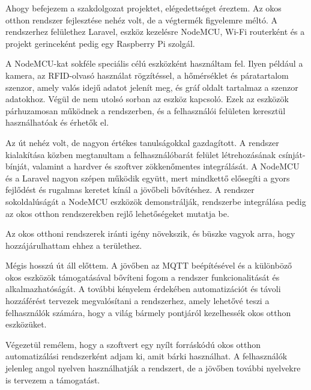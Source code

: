 \documentclass[
]{thesis-ekf}
\theoremstyle{definition}
\theoremstyle{remark}
\begin{document}
	Ahogy befejezem a szakdolgozat projektet, elégedettséget éreztem. Az okos otthon rendszer fejlesztése nehéz volt, de a végtermék figyelemre méltó. A rendszerhez felülethez Laravel, eszköz kezelésre NodeMCU, Wi-Fi routerként és a projekt gerinceként pedig egy Raspberry Pi szolgál.
	
	A NodeMCU-kat sokféle speciális célú eszközként használtam fel. Ilyen például a kamera, az RFID-olvasó használat rögzítéssel, a hőmérséklet és páratartalom szenzor, amely valós idejű adatot jelenít meg, és gráf oldalt tartalmaz a szenzor adatokhoz.  Végül de nem utolsó sorban az eszköz kapcsoló. Ezek az eszközök párhuzamosan működnek a rendszerben, és a felhasználói felületen keresztül használhatóak és érhetők el.
	
	Az út nehéz volt, de nagyon értékes tanulságokkal gazdagított. A rendszer kialakítása közben megtanultam a felhasználóbarát felület létrehozásának csínját-bínját, valamint a hardver és szoftver zökkenőmentes integrálását. A NodeMCU és a Laravel nagyon szépen működik együtt, mert mindkettő elősegíti a gyors fejlődést és rugalmas keretet kínál a jövőbeli bővítéshez. A rendszer sokoldalúságát a NodeMCU eszközök demonstrálják, rendszerbe integrálása pedig az okos otthon rendszerekben rejlő lehetőségeket mutatja be.
	
	Az okos otthoni rendszerek iránti igény növekszik, és büszke vagyok arra, hogy hozzájárulhattam ehhez a területhez.
	
	Mégis hosszú út áll előttem. A jövőben az MQTT beépítésével és a különböző okos eszközök támogatásával bővíteni fogom a rendszer funkcionalitását és alkalmazhatóságát. A további kényelem érdekében automatizációt és távoli hozzáférést tervezek megvalósítani a rendszerhez, amely lehetővé teszi a felhasználók számára, hogy a világ bármely pontjáról kezelhessék okos otthon eszközüket.
	
	Végezetül remélem, hogy a szoftvert egy nyílt forráskódú okos otthon automatizálási rendszerként adjam ki, amit bárki használhat. A felhasználók jelenleg angol nyelven használhatják a rendszert, de a jövőben további nyelvekre is tervezem a támogatást.
	
	
	
\end{document}
